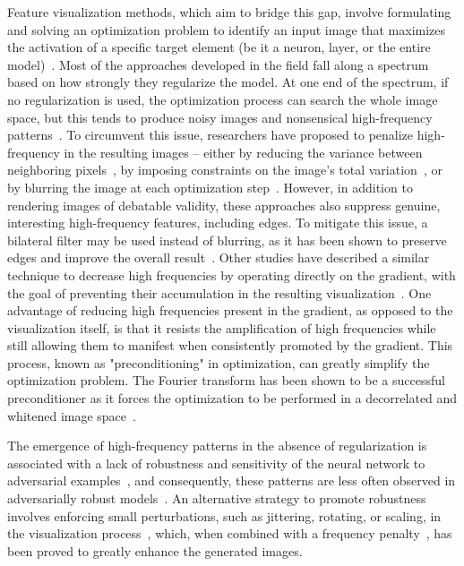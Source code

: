Feature visualization methods, which aim to bridge this gap, involve formulating and solving an optimization problem to identify an input image that maximizes the activation of a specific target element (be it a neuron, layer, or the entire model)~\cite{zeiler2014visualizing}. Most of the approaches developed in the field fall along a spectrum based on how strongly they regularize the model. At one end of the spectrum, if no regularization is used, the optimization process can search the whole image space, but this tends to produce noisy images and nonsensical high-frequency patterns~\cite{erhan2009visualizing}. To circumvent this issue, researchers have proposed to penalize high-frequency in  the resulting images -- either by reducing the variance between neighboring pixels~\cite{mahendran2015understanding}, by imposing constraints on the image's total variation~\cite{nguyen2016synthesizing,nguyen2017plug,simonyan2014deep}, or by blurring the image at each optimization step~\cite{nguyen2015deep}. However, in addition to rendering images of debatable validity, these approaches also suppress genuine, interesting high-frequency features, including edges. To mitigate this issue, a bilateral filter may be used instead of blurring, as it has been shown to preserve edges and improve the overall result~\cite{tyka2016class}. Other studies have described a similar technique to decrease high frequencies by operating directly on the gradient, with the goal of preventing their accumulation in the resulting visualization~\cite{AudunGoogleNet}. One advantage of reducing high frequencies present in the gradient, as opposed to the visualization itself, is that it resists the amplification of high frequencies while still allowing them to manifest when consistently promoted by the gradient.
This process, known as "preconditioning" in optimization, can greatly simplify the optimization problem. The Fourier transform has been shown to be a successful preconditioner as it forces the optimization to be performed in a decorrelated and whitened image space~\cite{olah2017feature}. 

The emergence of high-frequency patterns in the absence of regularization is associated with a lack of robustness and sensitivity of the neural network to adversarial examples~\cite{szegedy2013intriguing}, and consequently, these patterns are less often observed in adversarially robust models~\cite{engstrom2019adversarial, santurkar2019image, tsipras2018robustness}. An alternative strategy to promote robustness involves enforcing small perturbations, such as jittering, rotating, or scaling, in the visualization process~\cite{mordvintsev2015inceptionism}, which, when combined with a frequency penalty~\cite{olah2017feature}, has been proved to greatly enhance the generated images.

